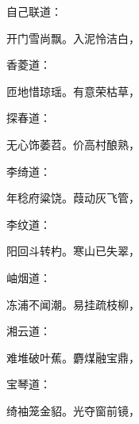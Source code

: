 \begin{parag}
    自己联道：
\end{parag}
\begin{poem}
    \begin{pl} 开门雪尚飘。入泥怜洁白，\end{pl}
\end{poem}
\begin{parag}
    香菱道：
\end{parag}
\begin{poem}
    \begin{pl} 匝地惜琼瑶。有意荣枯草，\end{pl}
\end{poem}
\begin{parag}
    探春道：
\end{parag}
\begin{poem}
    \begin{pl} 无心饰萎苕。价高村酿熟，\end{pl}
\end{poem}
\begin{parag}
    李绮道：
\end{parag}
\begin{poem}
    \begin{pl} 年稔府粱饶。葭动灰飞管，\end{pl}
\end{poem}
\begin{parag}
    李纹道：
\end{parag}
\begin{poem}
    \begin{pl} 阳回斗转杓。寒山已失翠，\end{pl}
\end{poem}
\begin{parag}
    岫烟道：
\end{parag}
\begin{poem}
    \begin{pl} 冻浦不闻潮。易挂疏枝柳，\end{pl}
\end{poem}
\begin{parag}
    湘云道：
\end{parag}
\begin{poem}
    \begin{pl} 难堆破叶蕉。麝煤融宝鼎，\end{pl}
\end{poem}
\begin{parag}
    宝琴道：
\end{parag}
\begin{poem}
    \begin{pl} 绮袖笼金貂。光夺窗前镜，\end{pl}
\end{poem}
